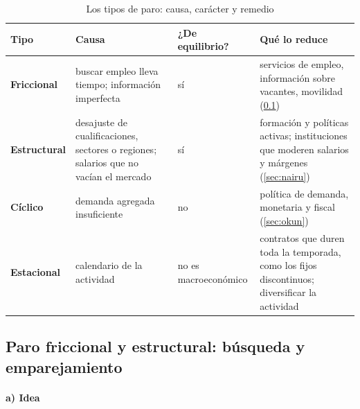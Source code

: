 \documentclass[11pt]{article}
\begin{document}
\begin{table}[H]
\centering
\caption{Los tipos de paro: causa, carácter y remedio}\label{tab:tipos-paro}
\small
\begin{tabular}{>{\centering\arraybackslash}m{2.2cm}>{\raggedright\arraybackslash}m{4.4cm}>{\centering\arraybackslash}m{2.4cm}>{\raggedright\arraybackslash}m{5.2cm}}
\toprule
\rowcolor{tceeazulpalido}\textbf{Tipo} & \textbf{Causa} & \textbf{¿De equilibrio?} & \textbf{Qué lo reduce}\\
\midrule
\textcolor{tceeverde}{\textbf{Friccional}} & buscar empleo lleva tiempo; información imperfecta & \textcolor{tceeverde}{sí} & servicios de empleo, información sobre vacantes, movilidad (\ref{sec:busqueda-natural})\\
\addlinespace[0.3em]
\textcolor{tceedorado}{\textbf{Estructural}} & desajuste de cualificaciones, sectores o regiones; salarios que no vacían el mercado & \textcolor{tceedorado}{sí} & formación y políticas activas; instituciones que moderen salarios y márgenes (\ref{sec:nairu})\\
\addlinespace[0.3em]
\textcolor{tceerojo}{\textbf{Cíclico}} & demanda agregada insuficiente & \textcolor{tceerojo}{no} & política de demanda, monetaria y fiscal (\ref{sec:okun})\\
\addlinespace[0.3em]
\textbf{Estacional} & calendario de la actividad & no es macroeconómico & contratos que duren toda la temporada, como los fijos discontinuos; diversificar la actividad\\
\bottomrule
\end{tabular}
\end{table}

\subsection{Paro friccional y estructural: búsqueda y emparejamiento}\label{sec:busqueda-natural}

\paragraph{a) Idea}
\end{document}
